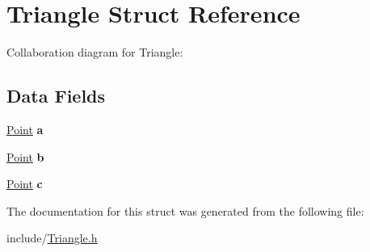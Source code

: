 \hypertarget{struct_triangle}{\section{Triangle Struct Reference}
\label{struct_triangle}
}


Collaboration diagram for Triangle\+:
\subsection*{Data Fields}
\begin{DoxyCompactItemize}
\item 
\hypertarget{struct_triangle_a2811abfeb3a322f685664bda50e95eeb}{\hyperlink{struct_vecteur}{Point} {\bfseries a}}\label{struct_triangle_a2811abfeb3a322f685664bda50e95eeb}

\item 
\hypertarget{struct_triangle_a22c5289a6ac90ff9bb347502930b58f8}{\hyperlink{struct_vecteur}{Point} {\bfseries b}}\label{struct_triangle_a22c5289a6ac90ff9bb347502930b58f8}

\item 
\hypertarget{struct_triangle_af006d5565840464caf743754ba1e2dc5}{\hyperlink{struct_vecteur}{Point} {\bfseries c}}\label{struct_triangle_af006d5565840464caf743754ba1e2dc5}

\end{DoxyCompactItemize}


The documentation for this struct was generated from the following file\+:\begin{DoxyCompactItemize}
\item 
include/\hyperlink{_triangle_8h}{Triangle.\+h}\end{DoxyCompactItemize}
